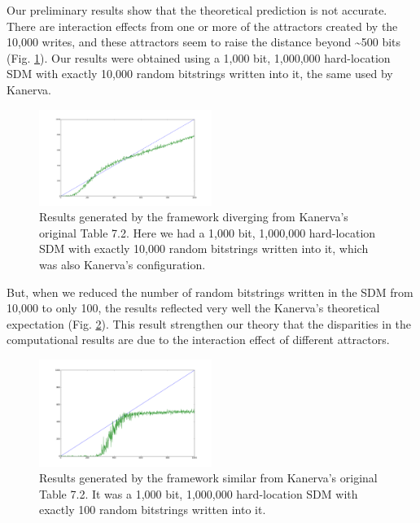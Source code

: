 Our preliminary results show that the theoretical prediction is not accurate.  There are interaction effects from one or more of the attractors created by the 10,000 writes, and these attractors seem to raise the distance beyond \textasciitilde 500 bits (Fig. \ref{sdm-10000w-table-7-2}). Our results were obtained using a 1,000 bit, 1,000,000 hard-location SDM with exactly 10,000 random bitstrings written into it, the same used by Kanerva.

\begin{figure}[h]
\centering\includegraphics[width=0.5\textwidth]{images02/sdm-10000w-table-7-2.png}
\caption{Results generated by the framework diverging from Kanerva's original Table 7.2. Here we had a 1,000 bit, 1,000,000 hard-location SDM with exactly 10,000 random bitstrings written into it, which was also Kanerva's configuration.
\label{sdm-10000w-table-7-2}}
\end{figure}

But, when we reduced the number of random bitstrings written in the SDM from 10,000 to only 100, the results reflected very well the Kanerva's theoretical expectation (Fig. \ref{sdm-100w-table-7-2}). This result strengthen our theory that the disparities in the computational results are due to the interaction effect of different attractors.

\begin{figure}[h]
\centering\includegraphics[width=0.5\textwidth]{images02/sdm-100w-table-7-2.png}
\caption{Results generated by the framework similar from Kanerva's original Table 7.2. It was a 1,000 bit, 1,000,000 hard-location SDM with exactly 100 random bitstrings written into it.
\label{sdm-100w-table-7-2}}
\end{figure}

